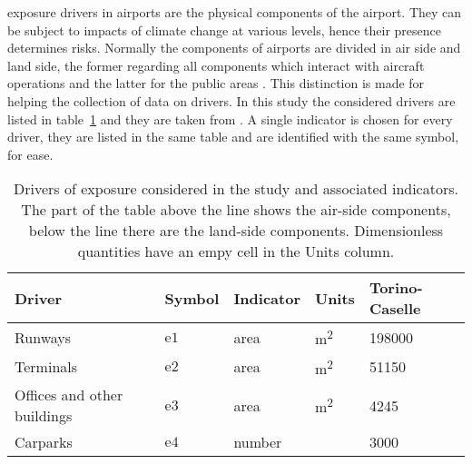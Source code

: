 \Gls{exposure} \glspl{driver} in airports are the physical components of the airport. They can be subject to \glspl{impact} of climate change at various levels, hence their presence determines \glspl{risk}. Normally the components of airports are divided in air side and land side, the former regarding all components which interact with aircraft operations and the latter for the public areas \cite[553]{2022DeVivoRiskAssessment}. This distinction is made for helping the collection of data on drivers.
In this study the considered drivers are listed in table~\ref{tab:drivers_exposure} and they are taken from \cite[554]{2022DeVivoRiskAssessment}. A single \gls{indicator} is chosen for every driver, they are listed in the same table and are identified with the same symbol, for ease.
\begin{table}[h]
  \centering
  \caption{Drivers of exposure considered in the study and associated indicators. The part of the table above the line shows the air-side components, below the line there are the land-side components. Dimensionless quantities have an empy cell in the Units column.}
  \label{tab:drivers_exposure}
  \begin{tabular}{p{}llll}
    Driver                      & Symbol        & Indicator & Units                & Torino-Caselle \\
    \hline
    Runways                     & $\mathrm{e1}$ & area      & \unit{\square\metre} & 198000         \\
    \hline
    Terminals                   & $\mathrm{e2}$ & area      & \unit{\square\metre} & 51150          \\
    Offices and other buildings & $\mathrm{e3}$ & area      & \unit{\square\metre} & 4245           \\
    Carparks                    & $\mathrm{e4}$ & number    &                      & 3000           \\
  \end{tabular}
\end{table}

